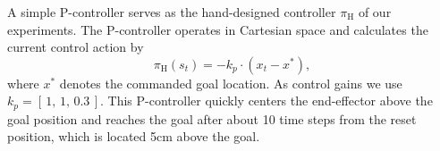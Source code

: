 A simple P-controller serves as the hand-designed controller $\pi_\text{H}$ of our experiments.  The P-controller operates in Cartesian space and calculates the current control action by 
\begin{equation}
\pi_\text{H}(s_t) = - k_p\cdot (x_t - x^{*}), 
\end{equation}
where $x^{*}$ denotes the commanded goal location. As control gains we use $k_p = [\,1, \,1,\, 0.3\,]$. This P-controller quickly centers the end-effector above the goal position and reaches the goal after about 10 time steps from the reset position, which is located 5cm above the goal.

\begin{figure}[ht!]
    \centering
\end{figure}
